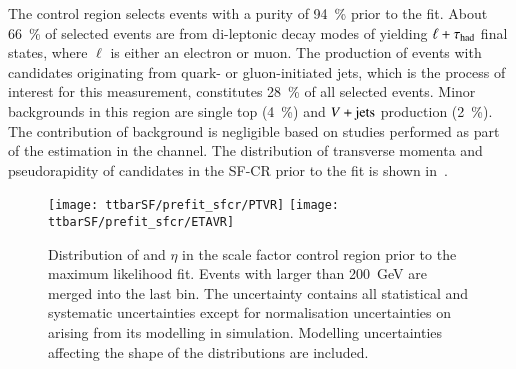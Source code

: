 
The control region selects \ttbar events with a purity of
\SI{94}{\percent} prior to the fit. About \SI{66}{\percent} of
selected events are from di-leptonic decay modes of \ttbar yielding
$\ell + \tau_{\text{had}}$ final states, where $\ell$ is either an electron or
muon. The production of \ttbar events with \tauhadvis candidates
originating from quark- or gluon-initiated jets, which is the process
of interest for this measurement, constitutes \SI{28}{\percent} of all
selected events. Minor backgrounds in this region are single top
(\SI{4}{\percent}) and $V+\text{jets}$ production (\SI{2}{\percent}). The
contribution of \multijet background is negligible based on studies
performed as part of the \faketauhadvis estimation in the \lephad
channel. The distribution of transverse momenta and pseudorapidity of
\tauhadvis candidates in the SF-CR prior to the fit is shown
in~.

\begin{figure}[htbp]
  \centering

  \texttt{[image: ttbarSF/prefit\_sfcr/PTVR]}%
  \texttt{[image: ttbarSF/prefit\_sfcr/ETAVR]}

  \caption{Distribution of \tauhadvis \pT and $\eta$ in the scale
    factor control region prior to the maximum likelihood fit. Events
    with \tauhadvis \pT larger than \SI{200}{\GeV} are merged into the
    last bin. The uncertainty contains all statistical and systematic
    uncertainties except for normalisation uncertainties on \ttbar
    arising from its modelling in simulation. Modelling uncertainties
    affecting the shape of the distributions are included.}%
  \label{fig:ttbarSF_prefit_pt}
\end{figure}

